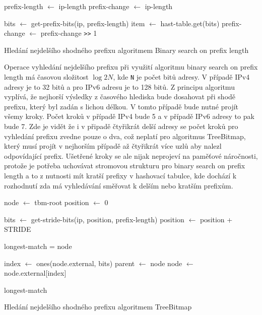 \begin{algorithm}
	prefix-length $\leftarrow$ ip-length\;
	prefix-change $\leftarrow$ ip-length\;
	{
		bits $\leftarrow$ get-prefix-bits(ip, prefix-length)\;
		item $\leftarrow$ hast-table.get(bits)\;
		prefix-change $\leftarrow$ prefix-change \texttt{>>} 1\;

	}
	\caption{Hledání nejdelšího shodného prefixu algoritmem Binary search on prefix length}
\end{algorithm}


Operace vyhledání nejdelšího prefixu při využití algoritmu binary search on prefix length má časovou
složitost $\log{2}{N}$, kde \texttt{N} je počet bitů adresy. V případě IPv4 adresy je to 32 bitů a pro IPv6
adresu je to 128 bitů. Z principu algoritmu vyplívá, že nejhorší výsledky z časového hlediska bude dosahovat
při shodě prefixu, který byl zadán s lichou délkou. V tomto případě bude nutné projít všemy kroky.
Počet kroků v případě IPv4 bude 5 a v případě IPv6 adresy to pak bude 7.
Zde je vidět že i v připadě čtyřikrát delší adresy se počet kroků pro vyhledání prefixu zvedne pouze o dva,
což neplatí pro algoritmus TreeBitmap, který musí projít v nejhorším případě až čtyřikrát více
uzlů aby nalezl odpovídající prefix. Ušetřené kroky se ale nijak neprojeví na paměťové náročnosti,
protože je potřeba uchovávat stromovou strukturu pro binary search on prefix length a to z nutnosti
mít kratší prefixy v hashovací tabulce, kde dochází k rozhodnutí zda má vyhledávání směřovat k delším nebo kratším prefixům.
\cite{bspl}

\begin{algorithm}
	node $\leftarrow$ tbm-root\;
	position $\leftarrow$ 0\;
	{
		bits $\leftarrow$ get-stride-bits(ip, position, prefix-length)\;
		position $\leftarrow$ position + STRIDE\;

		{
			longest-match = node\;
		}

		index $\leftarrow$ ones(node.external, bits)\;
		parent $\leftarrow$ node\;
		node $\leftarrow$ node.external[index]\;
	}
	\Return longest-match\;
	\caption{Hledání nejdelšího shodného prefixu algoritmem TreeBitmap}
\end{algorithm}

